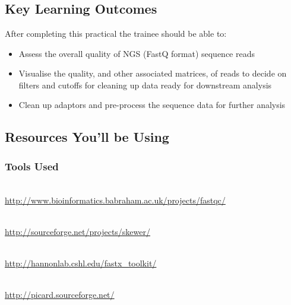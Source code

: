 
\chapter{\moduleTitle}
\newpage

\section{Key Learning Outcomes}

After completing this practical the trainee should be able to:
\begin{itemize}
  \item Assess the overall quality of NGS (FastQ format) sequence reads
  \item Visualise the quality, and other associated matrices, of reads to decide
        on filters and cutoffs for cleaning up data ready for downstream analysis
  \item Clean up adaptors and pre-process the sequence data for further analysis
\end{itemize}

\section{Resources You'll be Using}
 
\subsection{Tools Used}
\begin{description}[style=multiline,labelindent=0cm,align=left,leftmargin=0.5cm]
  \item[FastQC]\hfill\\
  	\url{http://www.bioinformatics.babraham.ac.uk/projects/fastqc/}
  \item[Skewer]\hfill\\
   	\url{http://sourceforge.net/projects/skewer/}
  \item[FASTX-Toolkit]\hfill\\
 	\url{http://hannonlab.cshl.edu/fastx_toolkit/}
  \item[Picard]\hfill\\
  	\url{http://picard.sourceforge.net/}
\end{description}

